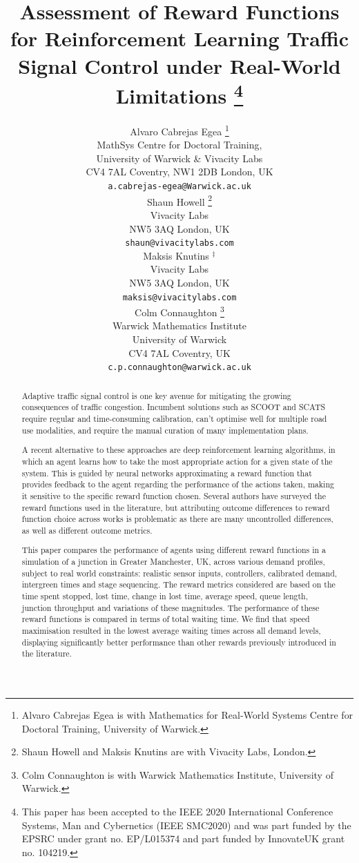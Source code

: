 \documentclass{article}
\title{Assessment of Reward Functions for Reinforcement Learning Traffic Signal Control under Real-World Limitations \thanks{This paper has been accepted to the IEEE 2020 International Conference Systems, Man and Cybernetics (IEEE SMC2020) and was part funded by the EPSRC under grant no. EP/L015374 and part funded by InnovateUK grant no. 104219.}}
\author{
  Alvaro Cabrejas Egea \thanks{Alvaro Cabrejas Egea is with Mathematics for Real-World Systems Centre for Doctoral Training, University of Warwick.} \\
  MathSys Centre for Doctoral Training, \\
  University of Warwick \& Vivacity Labs\\
  CV4 7AL Coventry, NW1 2DB London, UK \\
  \texttt{a.cabrejas-egea@Warwick.ac.uk} \\
  \And
 Shaun Howell \thanks{Shaun Howell and Maksis Knutins are with Vivacity Labs, London.}\\
  Vivacity Labs\\
   NW5 3AQ London, UK \\
  \texttt{shaun@vivacitylabs.com} \\
  \And
Maksis Knutins $^\ddag$ \\
  Vivacity Labs\\
   NW5 3AQ London, UK \\
  \texttt{maksis@vivacitylabs.com} \\
   \And
 Colm Connaughton \thanks{Colm Connaughton is with Warwick Mathematics Institute, University of Warwick.}\\
  Warwick Mathematics Institute\\
  University of Warwick\\
  CV4 7AL Coventry, UK \\
  \texttt{c.p.connaughton@warwick.ac.uk} \\
}
\begin{document}
\maketitle

\begin{abstract}
Adaptive traffic signal control is one key avenue for mitigating the growing consequences of traffic congestion.
Incumbent solutions such as SCOOT and SCATS require regular and time-consuming calibration, can't optimise well for multiple road use modalities, and require the manual curation of many implementation plans.

A recent alternative to these approaches are deep reinforcement learning algorithms, in which an agent learns how to take the most appropriate action for a given state of the system.
This is guided by neural networks approximating a reward function that provides feedback to the agent regarding the performance of the actions taken, making it sensitive to the specific reward function chosen.
Several authors have surveyed the reward functions used in the literature, but attributing outcome differences to reward function choice across works is problematic as there are many uncontrolled differences, as well as different outcome metrics.

This paper compares the performance of agents using different reward functions in a simulation of a junction in Greater Manchester, UK, across various demand profiles, subject to real world constraints: realistic sensor inputs, controllers, calibrated demand, intergreen times and stage sequencing. 
The reward metrics considered are based on the time spent stopped, lost time, change in lost time, average speed, queue length, junction throughput and variations of these magnitudes.
The performance of these reward functions is compared in terms of total waiting time.
We find that speed maximisation resulted in the lowest average waiting times across all demand levels, displaying significantly better performance than other rewards previously introduced in the literature.
\end{abstract}
\end{document}
